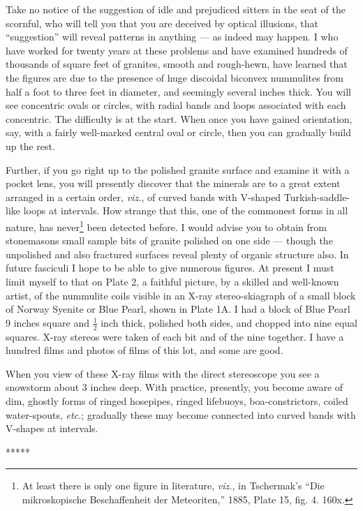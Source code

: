 \documentclass[a4paper, 12pt, oneside]{article}
\begin{document}
Take no notice of the suggestion of idle and prejudiced sitters in the seat of the scornful, who will tell you that you are deceived by optical illusions, that ``suggestion'' will reveal patterns in anything --- as indeed may happen. I who have worked for twenty years at these problems and have examined hundreds of thousands of square feet of granites, smooth and rough-hewn, have learned that the figures are due to the presence of huge discoidal biconvex nummulites from half a foot to three feet in diameter, and seemingly several inches thick. You will see concentric ovals or circles, with radial bands and loops associated with each concentric. The difficulty is at the start. When once you have gained orientation, say, with a fairly well-marked central oval or circle, then you can gradually build up the rest.

Further, if you go right up to the polished granite surface and examine it with a pocket lens, you will presently discover that the minerals are to a great extent arranged in a certain order, \emph{viz.}, of curved bands with V-shaped Turkish-saddle-like loops at intervals. How strange that this, one of the commonest forms in all nature, has never\footnote{At least there is only one figure in literature, \emph{viz.}, in Tschermak's ``Die mikroskopische Beschaffenheit der Meteoriten,'' 1885, Plate 15, fig. 4. 160x.} been detected before. I would advise you to obtain from stonemasons small sample bits of granite polished on one side --- though the unpolished and also fractured surfaces reveal plenty of organic structure also. In future fasciculi I hope to be able to give numerous figures. At present I must limit myself to that on Plate 2, a faithful picture, by a skilled and well-known artist, of the nummulite coils visible in an X-ray stereo-skiagraph of a small block of Norway Syenite or Blue Pearl, shown in Plate 1A. I had a block of Blue Pearl 9 inches square and $\frac{1}{2}$ inch thick, polished both sides, and chopped into nine equal squares. X-ray stereos were taken of each bit and of the nine together. I have a hundred films and photos of films of this lot, and some are good.

When you view of these X-ray films with the direct stereoscope you see a snowstorm about 3 inches deep. With practice, presently, you become aware of dim, ghostly forms of ringed hosepipes, ringed lifebuoys, boa-constrictors, coiled water-spouts, \emph{etc.}; gradually these may become connected into curved bands with V-shapes at intervals.

\centerline{*\hspace{15mm}*\hspace{15mm}*\hspace{15mm}*\hspace{15mm}*}
\bigskip
\end{document}
